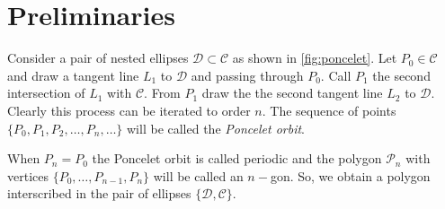 \section{Preliminaries}

Consider a pair of nested ellipses $\mathcal{D}\subset \mathcal{C}$ as shown in \cref{fig:poncelet}. Let $P_0\in \mathcal{C}$ and draw a tangent line $L_1$ to $\mathcal{D}$ and passing through $P_0$. Call $P_1$ the second intersection of $L_1$ with $\mathcal{C}.$
From $P_1$ draw the the second tangent line $L_2$ to $\mathcal{D}.$
Clearly this process can be iterated to order $n. $
The sequence of points $\{P_0,P_1,P_2,\ldots, P_n,\ldots\}$ will be called the {\em Poncelet orbit}.

When $P_n=P_0$ the Poncelet orbit is called periodic and the polygon $\mathcal{P}_n$ with vertices $\{P_0,\ldots, P_{n-1}, P_n\}$ will be called an $n-$gon. So, we obtain a polygon interscribed in the pair of ellipses $\{\mathcal{D},\mathcal{C}\}.$